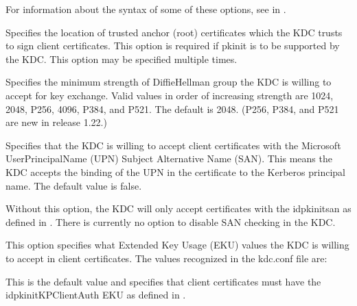 \documentclass[letterpaper,10pt,english]{sphinxmanual}
\begin{document}
\sphinxAtStartPar
For information about the syntax of some of these options, see
{\hyperref[\detokenize{admin/conf_files/krb5_conf:pkinit-identity}]{}} in
{\hyperref[\detokenize{admin/conf_files/krb5_conf:krb5-conf-5}]{}}.
\begin{description}
\sphinxAtStartPar
Specifies the location of trusted anchor (root) certificates which
the KDC trusts to sign client certificates.  This option is
required if pkinit is to be supported by the KDC.  This option may
be specified multiple times.

\sphinxAtStartPar
Specifies the minimum strength of Diffie\sphinxhyphen{}Hellman group the KDC is
willing to accept for key exchange.  Valid values in order of
increasing strength are 1024, 2048, P\sphinxhyphen{}256, 4096, P\sphinxhyphen{}384, and P\sphinxhyphen{}521.
The default is 2048.  (P\sphinxhyphen{}256, P\sphinxhyphen{}384, and P\sphinxhyphen{}521 are new in release
1.22.)

\sphinxAtStartPar
Specifies that the KDC is willing to accept client certificates
with the Microsoft UserPrincipalName (UPN) Subject Alternative
Name (SAN).  This means the KDC accepts the binding of the UPN in
the certificate to the Kerberos principal name.  The default value
is false.

\sphinxAtStartPar
Without this option, the KDC will only accept certificates with
the id\sphinxhyphen{}pkinit\sphinxhyphen{}san as defined in .  There is currently
no option to disable SAN checking in the KDC.

\sphinxAtStartPar
This option specifies what Extended Key Usage (EKU) values the KDC
is willing to accept in client certificates.  The values
recognized in the kdc.conf file are:
\begin{description}
\sphinxAtStartPar
This is the default value and specifies that client
certificates must have the id\sphinxhyphen{}pkinit\sphinxhyphen{}KPClientAuth EKU as
defined in .


\end{description}
\end{description}
\end{document}

